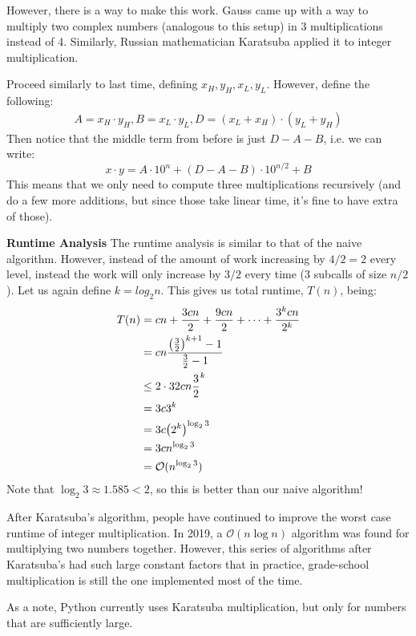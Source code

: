 However, there is a way to make this work. Gauss came up with a way to multiply two complex numbers (analogous to this setup) in
3 multiplications instead of 4. Similarly, Russian mathematician Karatsuba applied it to integer multiplication.

\begin{algothm}
    Proceed similarly to last time, defining $x_H, y_H, x_L, y_L$. However, define the following:
    \begin{align*}
        A = x_H \cdot y_H, B = x_L \cdot y_L, D = (x_L + x_H) \cdot (y_L + y_H)
    \end{align*}
    Then notice that the middle term from before is just $D - A - B$, i.e. we can write:
    \[ x \cdot y = A \cdot 10^n + (D - A - B) \cdot 10^{n/2} + B \]
    This means that we only need to compute three multiplications recursively (and do a few more additions, but since those take
    linear time, it's fine to have extra of those).

    \textbf{Runtime Analysis} The runtime analysis is similar to that of the naive algorithm. However, instead of the
    amount of work increasing by $4/2 = 2$ every level, instead the work will only increase by $3/2$ every time (3 subcalls of size $n/2$).
    Let us again define $k = log_2 n$. This gives us total runtime, $T(n)$, being:
    \begin{align*}
        T(n) &= cn + \frac{3cn}{2} + \frac{9cn}{2} + \cdots + \frac{3^k cn}{2^k} \\
        &= cn \frac{\qty(\frac{3}{2})^{k + 1} - 1}{\frac32 - 1} \\
        &\leq 2 \cdot {3}{2} cn \frac{3}{2}^k \\
        &= 3c 3^k \\
        &= 3c \qty(2^k)^{\log_2{3}} \\
        &= 3c n^{\log_2{3}} \\
        &= \mathcal{O}(n^{\log_2{3}})
    \end{align*}
    Note that $\log_2{3} \approx 1.585 < 2$, so this is better than our naive algorithm!
\end{algothm}

After Karatsuba's algorithm, people have continued to improve the worst case runtime of integer multiplication.
In 2019, a $\mathcal{O}(n \log n)$ algorithm was found for multiplying two numbers together. However, this series of algorithms
after Karatsuba's had such large constant factors that in practice, grade-school multiplication is still the one implemented most of the time.

As a note, Python currently uses Karatsuba multiplication, but only for numbers that are sufficiently large.